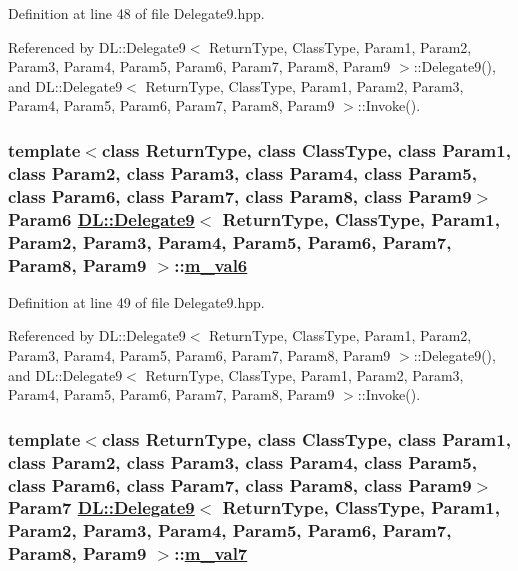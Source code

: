 Definition at line 48 of file Delegate9.hpp.

Referenced by DL::Delegate9$<$ Return\-Type, Class\-Type, Param1, Param2, Param3, Param4, Param5, Param6, Param7, Param8, Param9 $>$::Delegate9(), and DL::Delegate9$<$ Return\-Type, Class\-Type, Param1, Param2, Param3, Param4, Param5, Param6, Param7, Param8, Param9 $>$::Invoke().\hypertarget{classDL_1_1Delegate9_r7}{
\subsubsection[m\_\-val6]{\setlength{\rightskip}{0pt plus 5cm}template$<$class Return\-Type, class Class\-Type, class Param1, class Param2, class Param3, class Param4, class Param5, class Param6, class Param7, class Param8, class Param9$>$ Param6 \hyperlink{classDL_1_1Delegate9}{DL::Delegate9}$<$ Return\-Type, Class\-Type, Param1, Param2, Param3, Param4, Param5, Param6, Param7, Param8, Param9 $>$::\hyperlink{classDL_1_1Delegate9_r7}{m\_\-val6}}}
\label{classDL_1_1Delegate9_r7}




Definition at line 49 of file Delegate9.hpp.

Referenced by DL::Delegate9$<$ Return\-Type, Class\-Type, Param1, Param2, Param3, Param4, Param5, Param6, Param7, Param8, Param9 $>$::Delegate9(), and DL::Delegate9$<$ Return\-Type, Class\-Type, Param1, Param2, Param3, Param4, Param5, Param6, Param7, Param8, Param9 $>$::Invoke().\hypertarget{classDL_1_1Delegate9_r8}{
\subsubsection[m\_\-val7]{\setlength{\rightskip}{0pt plus 5cm}template$<$class Return\-Type, class Class\-Type, class Param1, class Param2, class Param3, class Param4, class Param5, class Param6, class Param7, class Param8, class Param9$>$ Param7 \hyperlink{classDL_1_1Delegate9}{DL::Delegate9}$<$ Return\-Type, Class\-Type, Param1, Param2, Param3, Param4, Param5, Param6, Param7, Param8, Param9 $>$::\hyperlink{classDL_1_1Delegate9_r8}{m\_\-val7}}}
\label{classDL_1_1Delegate9_r8}




